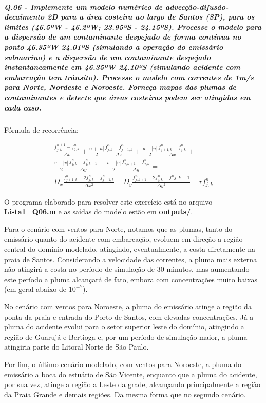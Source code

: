 \documentclass[11pt]{article}
\begin{document}
    \subparagraph{Q.06 - Implemente um modelo numérico de
advecção-difusão-decaimento 2D para a área costeira ao largo de Santos
(SP), para os limites (46.5ºW - 46.2ºW; 23.95ºS - 24.15ºS). Processe o
modelo para a dispersão de um contaminante despejado de forma contínua
no ponto 46.35ºW 24.01ºS (simulando a operação do emissário submarino) e
a dispersão de um contaminante despejado instantaneamente em 46.35ºW
24.10ºS (simulando acidente com embarcação tem trânsito). Processe o
modelo com correntes de 1m/s para Norte, Nordeste e Noroeste. Forneça
mapas das plumas de contaminantes e detecte que áreas costeiras podem
ser atingidas em cada
caso.}

Fórmula de recorrência:

\begin{equation}
\begin{aligned}
    \frac{f^{n+1}_{j,k} - f^{n}_{j,k}}{\Delta{t}} + \frac{u + |u|}{2}\frac{f^{n}_{j,k} - f^{n}_{j-1,k}}{\Delta{x}} + \frac{u - |u|}{2}\frac{f^{n}_{j+1,k} - f^{n}_{j,k}}{\Delta{x}} + \\
    \frac{v + |v|}{2}\frac{f^{n}_{j,k} - f^{n}_{j,k-1}}{\Delta{y}} + \frac{v - |v|}{2}\frac{f^{n}_{j,k+1} - f^{n}_{j,k}} {\Delta{y}} = \\
    D_x\frac{f^{n}_{j+1,k} - 2f^{n}_{j,k} + f^{n}_{j-1,k}}{\Delta{x^2}} + D_y\frac{f^{n}_{j,k+1} - 2f^{n}_{j,k} + f^{n}{j,k-1}}{\Delta{y^2}} - rf^{n}_{j,k}
\end{aligned}
\end{equation}

O programa elaborado para resolver este exercício está no arquivo
\textbf{Lista1\_Q06.m} e as saídas do modelo estão em \textbf{outputs/}.

Para o cenário com ventos para Norte, notamos que as plumas, tanto do
emissário quanto do acidente com embarcação, evoluem em direção a região
central do domínio modelado, atingindo, eventualmente, a costa
diretamente na praia de Santos. Considerando a velocidade das correntes,
a pluma mais externa não atingirá a costa no período de simulação de 30
minutos, mas aumentando este período a pluma alcançará de fato, embora
com concentrações muito baixas (em geral abaixo de \(10^{-7}\)).

No cenário com ventos para Noroeste, a pluma do emissário atinge a
região da ponta da praia e entrada do Porto de Santos, com elevadas
concentrações. Já a pluma do acidente evolui para o setor superior leste
do domínio, atingindo a região de Guarujá e Bertioga e, por um período
de simulação maior, a pluma atingiria parte do Litoral Norte de São
Paulo.

Por fim, o último cenário modelado, com ventos para Noroeste, a pluma do
emissário a boca do estuário de São Vicente, enquanto que a pluma do
acidente, por sua vez, atinge a região a Leste da grade, alcançando
principalmente a região da Praia Grande e demais regiões. Da mesma forma
que no segundo cenário.
\end{document}
